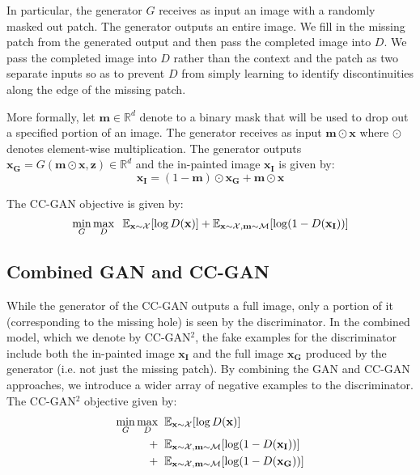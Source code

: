\documentclass{article} \usepackage{iclr2017_conference,times}
\begin{document}
In particular, the generator $G$ receives as input an image with a
randomly masked out patch.  The generator outputs an entire image. 
We fill in the missing patch from the generated output and then pass the completed image
into $D$.  
We pass the completed image into $D$ rather than the context and the patch as two separate inputs so as to prevent $D$ from simply learning to identify discontinuities along the edge of the missing patch.

More formally, let $\mathbf{m} \in \mathbb{R}^d$ denote to a binary mask that will be used to drop out a specified portion of an image. 
The generator receives as input $\mathbf{m} \odot \mathbf{x}$ where $\odot$ denotes element-wise multiplication.
The generator outputs $\mathbf{x_G} = G(\mathbf{m} \odot \mathbf{x}, \mathbf{z})
\in \mathbb{R}^d$ and the in-painted image $\mathbf{x_I}$ is given by: 
\begin{equation}
\mathbf{x_I} = (1 - \mathbf{m}) \odot \mathbf{x_G} + \mathbf{m} \odot \mathbf{x}
\end{equation}

The CC-GAN objective is given by:
\begin{equation}
\label{eqn:ccgan}
\min_G \max_D \hspace{2mm}\mathbb{E}_{\mathbf{x} \sim \mathcal{X}}[\log D(\mathbf{x})]  +
\mathbb{E}_{\mathbf{x} \sim \mathcal{X}, \mathbf{m} \sim \mathcal{M}} [\log(1 - D(\mathbf{x_I}))]
\end{equation}



\subsection{Combined GAN and CC-GAN}
While the generator of the CC-GAN outputs a full image, only a portion of it (corresponding to the missing hole) is seen by the discriminator. 
In the combined model, which we denote by CC-GAN$^2$, the fake
examples for the discriminator include both the in-painted image $\mathbf{x_I}$ and
the full image $\mathbf{x_G}$ produced by the generator (i.e. not just the missing patch). 
By combining the GAN and CC-GAN approaches, we introduce a wider array of negative examples to the discriminator. The CC-GAN$^2$ objective given by:
\begin{align}
\label{eqn:ccgan_comb}
\min_G \max_D \hspace{2mm} & \mathbb{E}_{\mathbf{x} \sim \mathcal{X}}[\log D(\mathbf{x})]  \\
+ \hspace{2mm} &\mathbb{E}_{\mathbf{x} \sim \mathcal{X}, \mathbf{m} \sim \mathcal{M}} [\log(1 - D(\mathbf{x_I}))]\\
+ \hspace{2mm} &\mathbb{E}_{\mathbf{x} \sim \mathcal{X}, \mathbf{m} \sim \mathcal{M}} [\log(1 - D(\mathbf{x_G} ))]
\end{align}
\end{document}
